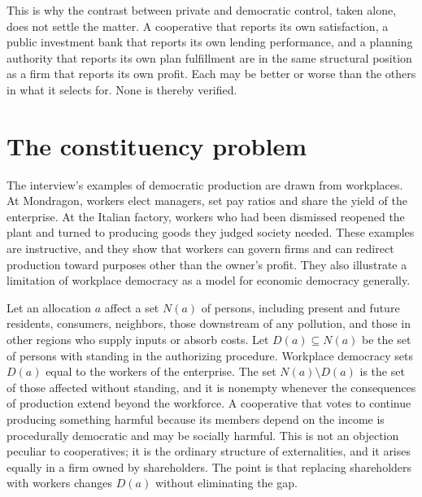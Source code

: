\documentclass[12pt]{article}
\theoremstyle{definition}
\begin{document}
This is why the contrast between private and democratic control, taken alone, does not settle the matter. A cooperative that reports its own satisfaction, a public investment bank that reports its own lending performance, and a planning authority that reports its own plan fulfillment are in the same structural position as a firm that reports its own profit. Each may be better or worse than the others in what it selects for. None is thereby verified.

\section{The constituency problem}\label{sec:constituency}

The interview's examples of democratic production are drawn from workplaces. At Mondragon, workers elect managers, set pay ratios and share the yield of the enterprise. At the Italian factory, workers who had been dismissed reopened the plant and turned to producing goods they judged society needed. These examples are instructive, and they show that workers can govern firms and can redirect production toward purposes other than the owner's profit. They also illustrate a limitation of workplace democracy as a model for economic democracy generally.

Let an allocation $a$ affect a set $N(a)$ of persons, including present and future residents, consumers, neighbors, those downstream of any pollution, and those in other regions who supply inputs or absorb costs. Let $D(a)\subseteq N(a)$ be the set of persons with standing in the authorizing procedure. Workplace democracy sets $D(a)$ equal to the workers of the enterprise. The set $N(a)\setminus D(a)$ is the set of those affected without standing, and it is nonempty whenever the consequences of production extend beyond the workforce. A cooperative that votes to continue producing something harmful because its members depend on the income is procedurally democratic and may be socially harmful. This is not an objection peculiar to cooperatives; it is the ordinary structure of externalities, and it arises equally in a firm owned by shareholders. The point is that replacing shareholders with workers changes $D(a)$ without eliminating the gap.
\end{document}
